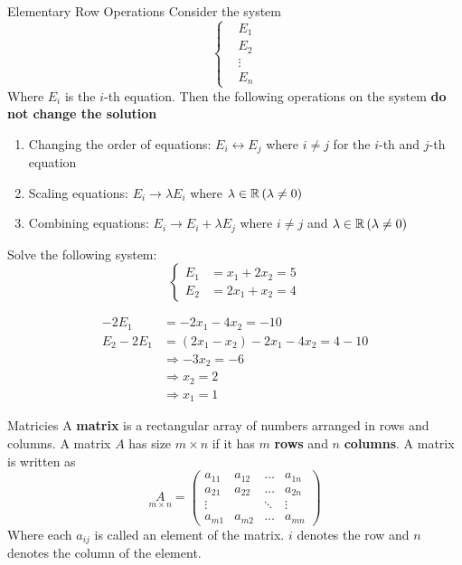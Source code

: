 \begin{impbox}{Elementary Row Operations}
    Consider the system 
    \[\begin{cases}
        &E_1 \\
        &E_2 \\
        &\vdots \\
        &E_n
    \end{cases}\]
    Where $E_i$ is the $i$-th equation. Then the following operations on the system \textbf{do not change the solution}
    \begin{enumerate}
        \item Changing the order of equations: $E_i \leftrightarrow E_j$ where $i \ne j$ for the $i$-th and $j$-th equation
        \item Scaling equations: $E_i \rightarrow \lambda E_i$ where $\lambda\in\mathbb R\left(\lambda \ne 0\right)$
        \item Combining equations: $E_i \rightarrow E_i + \lambda E_j$ where $i \ne j$ and $\lambda \in \mathbb R \left(\lambda \ne 0\right)$
    \end{enumerate}
\end{impbox}

\begin{example}{}{}
    Solve the following system:
    \[\begin{cases}
        E_1 &= x_1 + 2x_2 = 5 \\
        E_2 &= 2x_1 + x_2 = 4
    \end{cases}\]
    \begin{solution}
        \begin{align*}
            -2E_1 &= -2x_1 - 4x_2 = -10 \\
            E_2 - 2E_1 &= (2x_1 - x_2) - 2x_1 - 4x_2 = 4-10 \\
            &\Rightarrow -3x_2 = -6 \\
            &\Rightarrow x_2 = 2 \\
            &\Rightarrow x_1 = 1
        \end{align*}
    \end{solution}
\end{example}

\begin{defbox}{Matricies}
    A \textbf{matrix} is a rectangular array of numbers arranged in rows and columns. A matrix $A$ has size $m \times n$ if it has $m$ \textbf{rows} and $n$ \textbf{columns}. A matrix is written as
    \[\underset{m \times n}{A} = \begin{pmatrix}
    a_{11} & a_{12} & \dots & a_{1n} \\
    a_{21} & a_{22} & \dots & a_{2n} \\
    \vdots & & \ddots & \vdots \\
    a_{m1} & a_{m2} & \dots & a_{mn}
    \end{pmatrix}\]
    Where each $a_{ij}$ is called an element of the matrix. $i$ denotes the row and $n$ denotes the column of the element.
\end{defbox}

